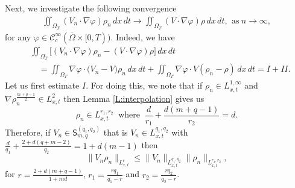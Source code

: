 \documentclass{amsart}
\numberwithin{equation}{section}
\newcommand{\calC}{{ \mathcal C  }}
\newcommand{\bke}[1]{\left( #1 \right)}
\begin{document}
Next, we investigate the following convergence
\begin{equation}\label{eq32 : Theorem-1}
\begin{aligned}
\iint_{\Omega_T}  (V_n \cdot \nabla \varphi  ) \rho_n \,dx\,dt
\longrightarrow  \iint_{\Omega_T}  (V \cdot \nabla \varphi ) \rho \,dx\,dt, \,~\mbox{as} \ n\rightarrow \infty,
\end{aligned}
\end{equation}
for any $\varphi \in \calC_c^\infty(\overline{\Omega} \times [0,T)) $. Indeed, we have
\begin{equation*}
\begin{aligned}
&\iint_{\Omega_T}  \big[(V_n \cdot \nabla \varphi ) \rho_n
- ( V \cdot \nabla \varphi ) \rho\big ] \,dx\,dt \\
&\quad = \iint_{\Omega_T}  \nabla \varphi \cdot \big (V_n- V\big )\rho_n  \,dx\,dt
+ \iint_{\Omega_T}  \nabla \varphi \cdot  V \bke{\rho_n- \rho}  \,dx\,dt
 = I + II.
\end{aligned}
\end{equation*}
  Let us first estimate $I$.  For doing this, we note that if $\rho_n \in L_{x,t}^{1,\infty}$ and $\nabla \rho_n^{\frac{m+q-1}{2}} \in L_{x,t}^{2}  $ then 
    Lemma \ref{L:interpolation} gives us
  \begin{equation*}
  \rho_n \in L_{x,t}^{r_1,r_2} \ \text{ where } \  \frac{d}{r_1} + \frac{d(m+q-1)}{r_2}=d.
  \end{equation*}
 Therefore, if $V_n \in \mathsf{S}_{m,q}^{(q_1, q_2)}$ that is $V_n \in L_{x,t}^{q_1,q_2}$ with $\frac{d}{q_1} + \frac{2+d(q+m-2)}{q_2}=1+d(m-1)$ then
 \begin{equation}\label{eq41 : Theorem-1}
 \|V_n\rho_n\|_{L_{x,t}^r} \leq \| V_n\|_{L_{x,t}^{q_1,q_2}} \|\rho_n \|_{L_{x,t}^{r_1,r_2}},                                      
 \end{equation}
for $ r= \frac{2+d(m+q-1)}{1+md}$, $r_1=\frac{ r q_1}{q_1-r} $ and $r_2=\frac{ r q_2}{q_2-r} $. 
\end{document}
